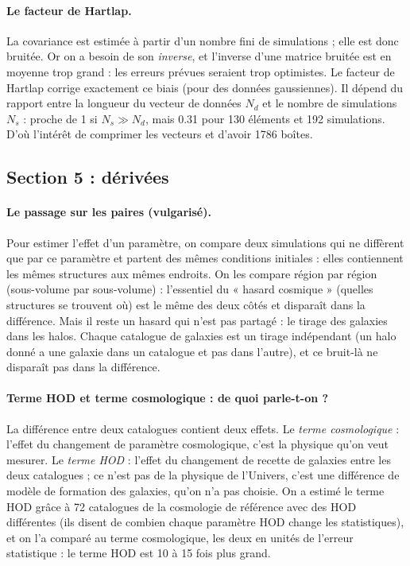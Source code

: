 \paragraph{Le facteur de Hartlap.} La covariance est estimée à partir d'un nombre fini de simulations ; elle est donc bruitée. Or on a besoin de son \emph{inverse}, et l'inverse d'une matrice bruitée est en moyenne trop grand : les erreurs prévues seraient trop optimistes. Le facteur de Hartlap corrige exactement ce biais (pour des données gaussiennes). Il dépend du rapport entre la longueur du vecteur de données $N_d$ et le nombre de simulations $N_s$ : proche de 1 si $N_s \gg N_d$, mais 0.31 pour 130 éléments et 192 simulations. D'où l'intérêt de comprimer les vecteurs et d'avoir 1786 boîtes.

\subsection{Section 5 : dérivées}

\paragraph{Le passage sur les paires (vulgarisé).} Pour estimer l'effet d'un paramètre, on compare deux simulations qui ne diffèrent que par ce paramètre et partent des mêmes conditions initiales : elles contiennent les mêmes structures aux mêmes endroits. On les compare région par région (sous-volume par sous-volume) : l'essentiel du « hasard cosmique » (quelles structures se trouvent où) est le même des deux côtés et disparaît dans la différence. Mais il reste un hasard qui n'est pas partagé : le tirage des galaxies dans les halos. Chaque catalogue de galaxies est un tirage indépendant (un halo donné a une galaxie dans un catalogue et pas dans l'autre), et ce bruit-là ne disparaît pas dans la différence.

\paragraph{Terme HOD et terme cosmologique : de quoi parle-t-on ?} La différence entre deux catalogues contient deux effets. Le \emph{terme cosmologique} : l'effet du changement de paramètre cosmologique, c'est la physique qu'on veut mesurer. Le \emph{terme HOD} : l'effet du changement de recette de galaxies entre les deux catalogues ; ce n'est pas de la physique de l'Univers, c'est une différence de modèle de formation des galaxies, qu'on n'a pas choisie. On a estimé le terme HOD grâce à 72 catalogues de la cosmologie de référence avec des HOD différentes (ils disent de combien chaque paramètre HOD change les statistiques), et on l'a comparé au terme cosmologique, les deux en unités de l'erreur statistique : le terme HOD est 10 à 15 fois plus grand.

